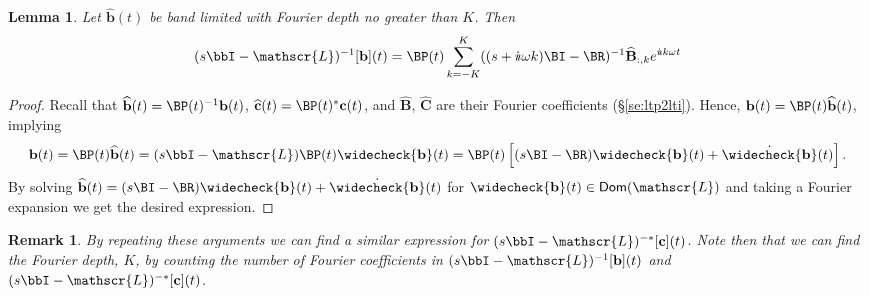 \documentclass[pdflatex,sn-mathphys-num]{sn-jnl}%
\theoremstyle{thmstyleone}%
\newtheorem{lemma}[theorem]{Lemma}%
\theoremstyle{thmstyletwo}%
\newtheorem{remark}{Remark}%
\theoremstyle{thmstylethree}%
\def\Bb{{\bf b}}  \def\BB{{\bf B}}
\def\Bc{{\bf c}}  \def\BC{{\bf C}}
\def\Cg{{\cal g}}
\def\ii{\dot{\imath\!\imath}}
\def\Lop{\mathscr{L}}
\def\Bhat{\widehat{\mathbf{B}}}
\def\bhat{\widehat{\mathbf{b}}}
\def\Chat{\widehat{\mathbf{C}}}
\def\chat{\widehat{\mathbf{c}}}
\begin{document}

\begin{lemma}
    \label{lem:bcheck}
    Let $\bhat(t)$ be band limited with Fourier depth no greater than $K$. Then
        $$
        (s\bbI-\Lop)^{-1}[\Bb](t) = \BP(t)\sum_{k=-K}^K((s+\ii \omega k)\BI - \BR)^{-1}\Bhat_{:,k}e^{\ii k\omega  t}
        $$
    \end{lemma}
\begin{proof}
Recall that $\bhat(t) = \BP(t)^{-1}\Bb(t)$, $\chat(t) = \BP(t)^*\Bc(t)$, and $\Bhat$, $\Chat$ are their Fourier coefficients (\S \ref{se:ltp2lti}). Hence, $\Bb(t) = \BP(t)\bhat(t)$, implying
\begin{equation}
\Bb(t)=\BP(t)\widehat{\Bb}(t)\\
=(s\bbI-\Lop)\BP(t)\widecheck{\Bb}(t)\\
=\BP(t)\left[(s\BI-\BR)\widecheck{\Bb}(t)+\dot{\widecheck{\Bb}}(t)\right].
\end{equation}
By solving 
$\widehat{\Bb}(t) = (s\BI-\BR)\widecheck{\Bb}(t)+\dot{\widecheck{\Bb}}(t)$
for $\widecheck{\Bb}(t)\in\mathsf{Dom}(\mathscr{L})$ and taking a Fourier expansion we get the desired expression. 
\end{proof}

\begin{remark}
\label{rm:depth}
By repeating these arguments we can find a similar expression for $(s\bbI-\Lop)^{-*}[\Bc](t)$. Note then that we can find the Fourier depth, $K$, by counting the number of Fourier coefficients in $(s\bbI-\Lop)^{-1}[\Bb](t)$ and $(s\bbI-\Lop)^{-*}[\Bc](t)$.
\end{remark}
\end{document}
